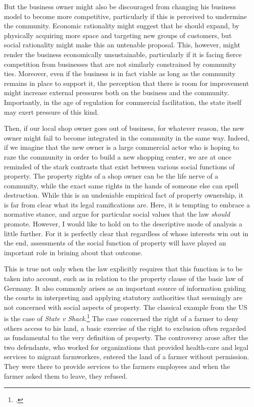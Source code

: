 But the business owner might also be discouraged from changing his business model to become more competitive, particularly if this is perceived to undermine the community. Economic rationality might suggest that he should expand, by physically acquiring more space and targeting new groups of customers, but social rationality might make this an untenable proposal. This, however, might render the business economically unsustainable, particularly if it is facing fierce competition from businesses that are not similarly constrained by community ties. Moreover, even if the business is in fact viable as long as the community remains in place to support it, the perception that there is room for improvement might increase external pressures both on the business and the community. Importantly, in the age of regulation for commercial facilitation, the state itself may exert pressure of this kind.

Then, if our local shop owner goes out of business, for whatever reason, the new owner might fail to become integrated in the community in the same way. Indeed, if we imagine that the new owner is a large commercial actor who is hoping to raze the community in order to build a new shopping center, we are at once reminded of the stark contrasts that exist between various social functions of property. The property rights of a shop owner can be the life nerve of a community, while the exact same rights in the hands of someone else can spell destruction. While this is an undeniable empirical fact of property ownership, it is far from clear what its legal ramifications are. Here, it is tempting to embrace a normative stance, and argue for particular social values that the law {\it should} promote. However, I would like to hold on to the descriptive mode of analysis a little further. For it is perfectly clear that regardless of whose interests win out in the end, assessments of the social function of property will have played an important role in brining about that outcome.

This is true not only when the law explicitly requires that this function is to be taken into account, such as in relation to the property clause of the basic law of Germany. It also commonly arises as an important source of information guiding the courts in interpreting and applying statutory authorities that seemingly are not concerned with social aspects of property. The classical example from the US is the case of {\it State v Shack}.\footcite{shack71} The case concerned the right of a farmer to deny others access to his land, a basic exercise of the right to exclusion often regarded as fundamental to the very definition of property. The controversy arose after the two defendants, who worked for organizations that provided health-care and legal services to migrant farmworkers, entered the land of a farmer without permission. They were there to provide services to the farmers employees and when the farmer asked them to leave, they refused.

